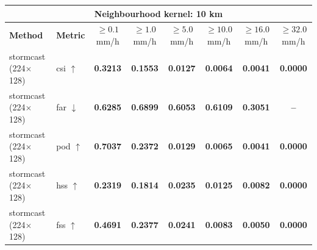 \documentclass[border=10pt]{standalone}
\begin{document}
\begin{tabular}{llcccccc}
\toprule
\multicolumn{8}{c}{\textbf{Neighbourhood kernel: 10 km}} \\
\midrule
\textbf{Method} & \textbf{Metric} & $\geq 0.1$ mm/h & $\geq 1.0$ mm/h & $\geq 5.0$ mm/h & $\geq 10.0$ mm/h & $\geq 16.0$ mm/h & $\geq 32.0$ mm/h \\
\midrule
stormcast (224$\times$128) & csi $\uparrow$ & \textbf{0.3213} & \textbf{0.1553} & \textbf{0.0127} & \textbf{0.0064} & \textbf{0.0041} & \textbf{0.0000} \\
\midrule
stormcast (224$\times$128) & far $\downarrow$ & \textbf{0.6285} & \textbf{0.6899} & \textbf{0.6053} & \textbf{0.6109} & \textbf{0.3051} & \textbf{--} \\
\midrule
stormcast (224$\times$128) & pod $\uparrow$ & \textbf{0.7037} & \textbf{0.2372} & \textbf{0.0129} & \textbf{0.0065} & \textbf{0.0041} & \textbf{0.0000} \\
\midrule
stormcast (224$\times$128) & hss $\uparrow$ & \textbf{0.2319} & \textbf{0.1814} & \textbf{0.0235} & \textbf{0.0125} & \textbf{0.0082} & \textbf{0.0000} \\
\midrule
stormcast (224$\times$128) & fss $\uparrow$ & \textbf{0.4691} & \textbf{0.2377} & \textbf{0.0241} & \textbf{0.0083} & \textbf{0.0050} & \textbf{0.0000} \\
\bottomrule
\end{tabular}
\end{document}
